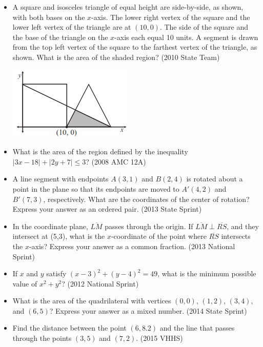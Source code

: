 \documentclass{article}
\begin{document}
\begin{itemize}

\item A square and isosceles triangle of equal height are side-by-side, as shown, with both bases on the $x$-axis. The lower right vertex of the square and the lower left vertex of the triangle are at $(10,0)$. The side of the square and the base of the triangle on the $x$-axis each equal 10 units. A segment is drawn from the top left vertex of the square to the farthest vertex of the triangle, as shown. What is the area of the shaded region? (2010 State Team)

\centerline{\includegraphics{201010.png}}

\item What is the area of the region defined by the inequality $|3x-18|+|2y+7|\le 3$? (2008 AMC 12A)

\item A line segment with endpoints $A(3,1)$ and $B(2,4)$ is rotated about a point in the plane so that its endpoints are moved to $A'(4,2)$ and $B'(7,3)$, respectively. What are the coordinates of the center of rotation? Express your answer as an ordered pair. (2013 State Sprint)

\item In the coordinate plane, $\overline{LM}$ passes through the origin. If $\overline{LM}\perp\overline{RS}$, and they intersect at (5,3), what is the $x$-coordinate of the point where $\overline{RS}$ intersects the $x$-axis? Express your answer as a common fraction. (2013 National Sprint)

\item If $x$ and $y$ satisfy $(x-3)^2+(y-4)^2=49$, what is the minimum possible value of $x^2+y^2$? (2012 National Sprint)

\item What is the area of the quadrilateral with vertices $(0,0)$, $(1,2)$, $(3,4)$, and $(6,5)$? Express your answer as a mixed number. (2014 State Sprint)

\item Find the distance between the point $(6,8.2)$ and the line that passes through the points $(3,5)$ and $(7,2)$. (2015 VHHS)


\end{itemize}
\end{document}
